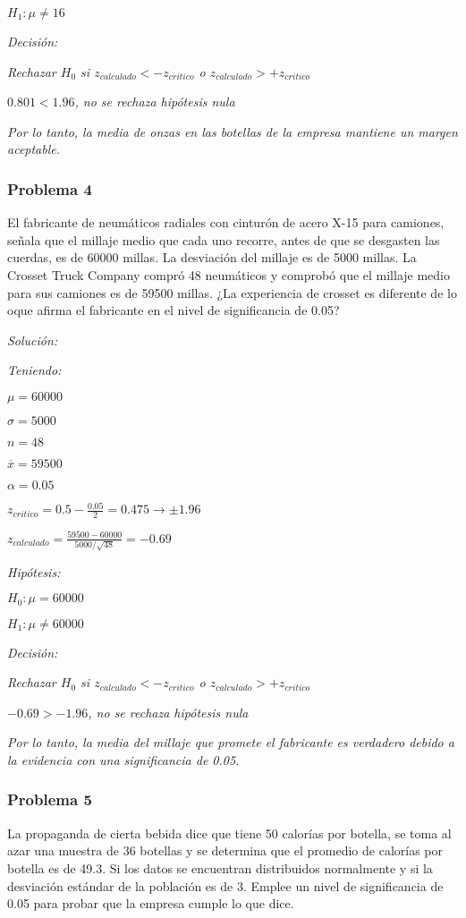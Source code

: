\documentclass[a4paper, 12pt]{article}
\begin{document}
$H_1:\mu\neq 16$

\emph{Decisión:}

\emph{Rechazar $H_0$ si $z_{calculado}<-z_{critico}$ o $z_{calculado}>+z_{critico}$}

$0.801<1.96$\emph{, no se rechaza hipótesis nula}

\emph{Por lo tanto, la media de onzas en las botellas de la empresa mantiene un margen aceptable.}

\subsubsection{Problema 4}
El fabricante de neumáticos radiales con cinturón de acero X-15 para camiones, señala que el millaje medio que cada uno recorre, antes de que se desgasten las cuerdas, es de 60000 millas. La desviación del millaje es de 5000 millas. La Crosset Truck Company compró 48 neumáticos y comprobó que el millaje medio para sus camiones es de 59500 millas. ¿La experiencia de crosset es diferente de lo oque afirma el fabricante en el nivel de significancia de 0.05?

\emph{Solución:}

\emph{Teniendo:}

$\mu=60000$

$\sigma=5000$

$n=48$

$\overline{x}=59500$

$\alpha=0.05$

$z_{critico}=0.5-\frac{0.05}{2}=0.475\to\pm 1.96$

$z_{calculado}=\frac{59500-60000}{5000/\sqrt{48}}=-0.69$

\emph{Hipótesis:}

$H_0:\mu=60000$

$H_1:\mu\neq 60000$

\emph{Decisión:}

\emph{Rechazar $H_0$ si $z_{calculado}<-z_{critico}$ o $z_{calculado}>+z_{critico}$}

$-0.69>-1.96$\emph{, no se rechaza hipótesis nula}

\emph{Por lo tanto, la media del millaje que promete el fabricante es verdadero debido a la evidencia con una significancia de 0.05.}

\subsubsection{Problema 5}
La propaganda de cierta bebida dice que tiene 50 calorías por botella, se toma al azar una muestra de 36 botellas y se determina que el promedio de calorías por botella es de 49.3. Si los datos se encuentran distribuidos normalmente y si la desviación estándar de la población es de 3. Emplee un nivel de significancia de 0.05 para probar que la empresa cumple lo que dice.
\end{document}
